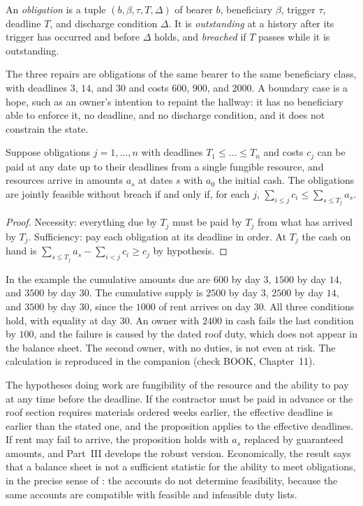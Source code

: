 \begin{definition}[Obligation]\label{def:obligation}
An \emph{obligation} is a tuple $(b,\beta,\tau,T,\Delta)$ of bearer $b$, beneficiary $\beta$, trigger $\tau$, deadline $T$, and discharge condition $\Delta$. It is \emph{outstanding} at a history after its trigger has occurred and before $\Delta$ holds, and \emph{breached} if $T$ passes while it is outstanding.
\end{definition}

The three repairs are obligations of the same bearer to the same beneficiary class, with deadlines $3$, $14$, and $30$ and costs $600$, $900$, and $2000$. A boundary case is a hope, such as an owner's intention to repaint the hallway: it has no beneficiary able to enforce it, no deadline, and no discharge condition, and it does not constrain the state.

\begin{proposition}\label{prop:deadline}
Suppose obligations $j=1,\dots,n$ with deadlines $T_1\le\dots\le T_n$ and costs $c_j$ can be paid at any date up to their deadlines from a single fungible resource, and resources arrive in amounts $a_s$ at dates $s$ with $a_0$ the initial cash. The obligations are jointly feasible without breach if and only if, for each $j$, $\sum_{i\le j}c_i\le\sum_{s\le T_j}a_s$.
\end{proposition}

\begin{proof}
Necessity: everything due by $T_j$ must be paid by $T_j$ from what has arrived by $T_j$. Sufficiency: pay each obligation at its deadline in order. At $T_j$ the cash on hand is $\sum_{s\le T_j}a_s-\sum_{i<j}c_i\ge c_j$ by hypothesis.
\end{proof}

In the example the cumulative amounts due are $600$ by day $3$, $1500$ by day $14$, and $3500$ by day $30$. The cumulative supply is $2500$ by day $3$, $2500$ by day $14$, and $3500$ by day $30$, since the $1000$ of rent arrives on day $30$. All three conditions hold, with equality at day $30$. An owner with $2400$ in cash fails the last condition by $100$, and the failure is caused by the dated roof duty, which does not appear in the balance sheet. The second owner, with no duties, is not even at risk. The calculation is reproduced in the companion (check BOOK, Chapter~11).

The hypotheses doing work are fungibility of the resource and the ability to pay at any time before the deadline. If the contractor must be paid in advance or the roof section requires materials ordered weeks earlier, the effective deadline is earlier than the stated one, and the proposition applies to the effective deadlines. If rent may fail to arrive, the proposition holds with $a_s$ replaced by guaranteed amounts, and Part~III develops the robust version. Economically, the result says that a balance sheet is not a sufficient statistic for the ability to meet obligations, in the precise sense of : the accounts do not determine feasibility, because the same accounts are compatible with feasible and infeasible duty lists.

